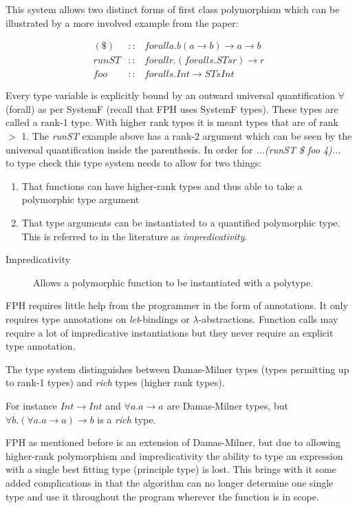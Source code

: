 This system allows two distinct forms of first class polymorphism which can be illustrated by a more involved example from the paper\cite{FPH}:

\begin{eqnarray*}
(\$)  &::& forall a. b (a\rightarrow b) \rightarrow a \rightarrow b\\
runST &::& forall r. (forall s. ST s r) \rightarrow r\\
foo   &::& forall s. Int \rightarrow ST s Int
\end{eqnarray*}

Every type variable is explicitly bound by an outward universal quantification $\forall$ (forall) as per SystemF (recall that FPH uses SystemF types). These types are called a rank-1 type. With higher rank types it is meant types that are of rank $>$ 1.
The \textit{runST} example above has a rank-2 argument which can be seen by the universal quantification inside the parenthesis.
In order for \textit{...(runST \$ foo 4)...} to type check this type system needs to allow for two things:
\begin{enumerate}
\item That functions can have higher-rank types and thus able to take a polymorphic type argument
\item That type arguments can be instantiated to a quantified polymorphic type. This is referred to in the literature as \textit{impredicativity}.
\end{enumerate}

\begin{description}
\item[Impredicativity] Allows a polymorphic function to be instantiated with a polytype. 
\end{description}

FPH requires little help from the programmer in the form of annotations. It only requires type annotations on \textit{let}-bindings or $\lambda$-abstractions. Function calls may require a lot of impredicative instantiations but they never require an explicit type annotation.

The type system distinguishes between Damas-Milner types (types permitting up to rank-1 types) and \textit{rich} types (higher rank types).

For instance $Int \rightarrow Int$ and $\forall a. a \rightarrow a$ are Damas-Milner types, but $\forall b.(\forall a. a \rightarrow a) \rightarrow b$ is a \textit{rich} type.

FPH as mentioned before is an extension of Damas-Milner, but due to allowing higher-rank polymorphism and impredicativity the ability to type an expression with a single best fitting type (principle type) is lost. This brings with it some added complications in that the algorithm can no longer determine one single type and use it throughout the program wherever the function is in scope.

